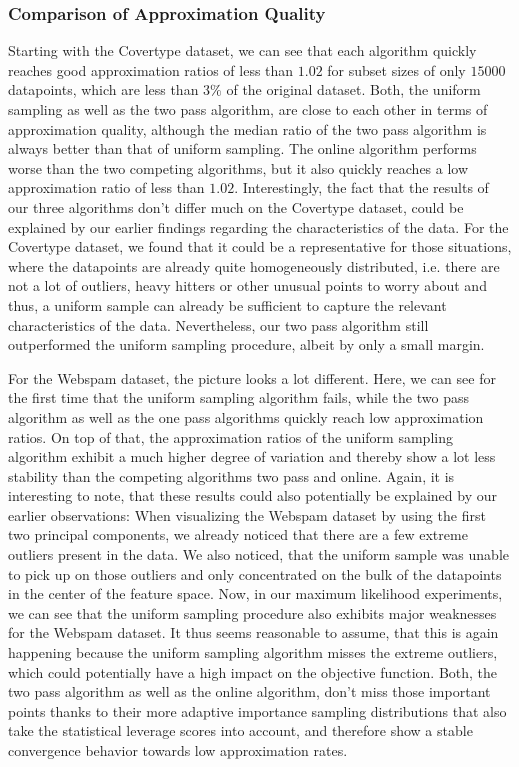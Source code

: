 \subsubsection{Comparison of Approximation Quality}

Starting with the Covertype dataset, we can see that each algorithm
quickly reaches good approximation ratios of less than $1.02$
for subset sizes of only $15000$ datapoints, which are less than
$3\%$ of the original dataset.
Both, the uniform sampling as well as the two pass algorithm, are
close to each other in terms of approximation quality, although
the median ratio of the two pass algorithm is always better than
that of uniform sampling. The online algorithm performs worse than
the two competing algorithms, but it also quickly reaches a low
approximation ratio of less than $1.02$.
Interestingly, the fact that the results of our three algorithms
don't differ much on the Covertype dataset, could
be explained by our earlier
findings regarding the characteristics of the data.
For the Covertype dataset, we found that it could be a representative for
those situations, where the datapoints are already
quite homogeneously distributed, i.e. there
are not a lot of outliers, heavy hitters or other unusual points to worry
about and thus, a uniform sample can already be sufficient to
capture the relevant characteristics of the data.
Nevertheless, our two pass algorithm still outperformed the uniform
sampling procedure, albeit by only a small margin.

For the Webspam dataset, the picture looks a lot different. Here,
we can see for the first time that the uniform sampling algorithm
fails, while the two pass algorithm as well as the one pass
algorithms quickly reach low approximation ratios. On top of that,
the approximation ratios of the uniform sampling algorithm
exhibit a much higher degree of variation and thereby show a lot
less stability than the competing algorithms two pass and online.
Again, it is interesting to note, that these results could also
potentially be explained by our earlier observations:
When visualizing the Webspam dataset by using the first two
principal components, we already noticed that there are a few
extreme outliers present in the data. We also noticed, that
the uniform sample was unable to pick up on those outliers
and only concentrated on the bulk of the datapoints in
the center of the feature space. Now, in our
maximum likelihood experiments,
we can see that the uniform sampling procedure also
exhibits major weaknesses
for the Webspam dataset. It thus seems reasonable to assume,
that this is again happening because the uniform sampling
algorithm misses the extreme outliers, which could potentially have a
high impact on the objective function.
Both, the two pass algorithm as well as the online algorithm,
don't miss those important points thanks to their more
adaptive importance sampling distributions that also take
the statistical leverage scores into account, and therefore show a
stable convergence behavior towards low approximation rates.

